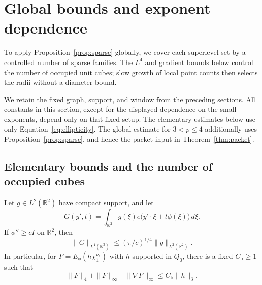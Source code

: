 \section{Global bounds and exponent dependence}\label{sec:global}

To apply Proposition~\ref{prop:sparse} globally, we cover each superlevel
set by a controlled number of sparse families. The $L^4$ and gradient
bounds below control the number of occupied unit cubes; slow growth of
local point counts then selects the radii without a diameter bound.

We retain the fixed graph, support, and window from the preceding
sections.  All constants in this section, except for the displayed
dependence on the small exponents, depend only on that fixed setup.
The elementary estimates below use only Equation~\eqref{eq:ellipticity}.
The global estimate for $3<p\leq4$ additionally uses
Proposition~\ref{prop:sparse}, and hence the packet input in
Theorem~\ref{thm:packet}.

\subsection{Elementary bounds and the number of occupied cubes}

\begin{lemma}\label{lem:basic}
Let $g\in L^2(\mathbb R^2)$ have compact support, and let
\[
 G(y',t)=\int_{\mathbb R^2}g(\xi)
                  e\big(y'\cdot\xi+t\phi(\xi)\big)\,d\xi.
\]
If $\phi''\geq cI$ on $\mathbb R^2$, then
\begin{equation}\label{eq:elementary-lfour}
 \|G\|_{L^4(\mathbb R^3)}
       \leq (\pi/c)^{1/4}\|g\|_{L^2(\mathbb R^2)}.
\end{equation}
In particular, for $F=E_\phi(h\chi_1^{\nu_*})$ with $h$ supported
in $Q_0$, there is a fixed $C_{\mathrm b}\geq1$ such that
\begin{equation}\label{eq:basic-bounds}
 \|F\|_4+\|F\|_\infty+\|\nabla F\|_\infty
       \leq C_{\mathrm b}\|h\|_3.
\end{equation}
\end{lemma}

